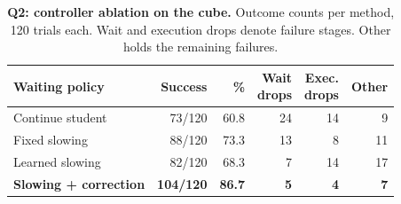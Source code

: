 \begin{table}[t]
\centering\small
\setlength{\tabcolsep}{2.5pt}
\begin{tabularx}{\linewidth}{@{}Xrrrrr@{}}
\toprule
Waiting policy & Success & \% & \shortstack{Wait\\drops} & \shortstack{Exec.\\drops} & Other\\
\midrule
Continue student & 73/120 & 60.8 & 24 & 14 & 9\\
Fixed slowing & 88/120 & 73.3 & 13 & 8 & 11\\
Learned slowing & 82/120 & 68.3 & 7 & 14 & 17\\
\textbf{Slowing + correction} & \textbf{104/120} & \textbf{86.7} & \textbf{5} & \textbf{4} & \textbf{7}\\
\bottomrule
\end{tabularx}
\caption{\textbf{Q2: controller ablation on the cube.} Outcome counts per method, 120 trials each. Wait and execution drops denote failure stages. Other holds the remaining failures.}
\label{tab:waiting}
\end{table}
